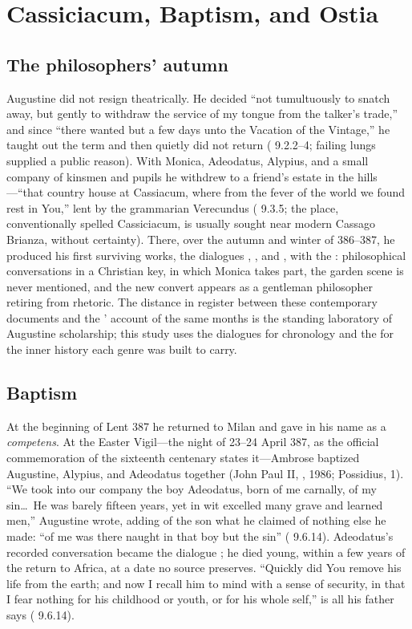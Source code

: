 \section{Cassiciacum, Baptism, and Ostia}

\subsection{The philosophers' autumn}

Augustine did not resign theatrically. He decided ``not tumultuously to
snatch away, but gently to withdraw the service of my tongue from the
talker's trade,'' and since ``there wanted but a few days unto the Vacation
of the Vintage,'' he taught out the term and then quietly did not return
( 9.2.2--4; failing lungs supplied a public reason). With
Monica, Adeodatus, Alypius, and a small company of kinsmen and pupils he
withdrew to a friend's estate in the hills---``that country house
at Cassiacum, where from the fever of the world we found rest in You,''
lent by the grammarian Verecundus ( 9.3.5; the place,
conventionally spelled Cassiciacum, is usually sought near modern Cassago
Brianza, without certainty). There, over the autumn and winter of 386--387,
he produced his first surviving works, the dialogues , , and , with the
: philosophical conversations in a Christian key, in which
Monica takes part, the garden scene is never mentioned, and the new convert
appears as a gentleman philosopher retiring from rhetoric. The distance in
register between these contemporary documents and the '
account of the same months is the standing laboratory of Augustine
scholarship; this study uses the dialogues for chronology and the
 for the inner history each genre was built to carry.

\subsection{Baptism}

At the beginning of Lent 387 he returned to Milan and gave in his name as a
\textit{competens}. At the Easter Vigil---the night of 23--24 April 387, as
the official commemoration of the sixteenth centenary states it---Ambrose
baptized Augustine, Alypius, and Adeodatus together (John Paul II,
, 1986; Possidius,  1). ``We took
into our company the boy Adeodatus, born of me carnally, of my sin\ldots\ He
was barely fifteen years, yet in wit excelled many grave and learned men,''
Augustine wrote, adding of the son what he claimed of nothing else he made:
``of me was there naught in that boy but the sin'' (
9.6.14). Adeodatus's recorded conversation became the dialogue ; he died young, within a few years of the return to Africa, at a
date no source preserves. ``Quickly did You remove his life from the earth;
and now I recall him to mind with a sense of security, in that I fear
nothing for his childhood or youth, or for his whole self,'' is all his
father says ( 9.6.14).

